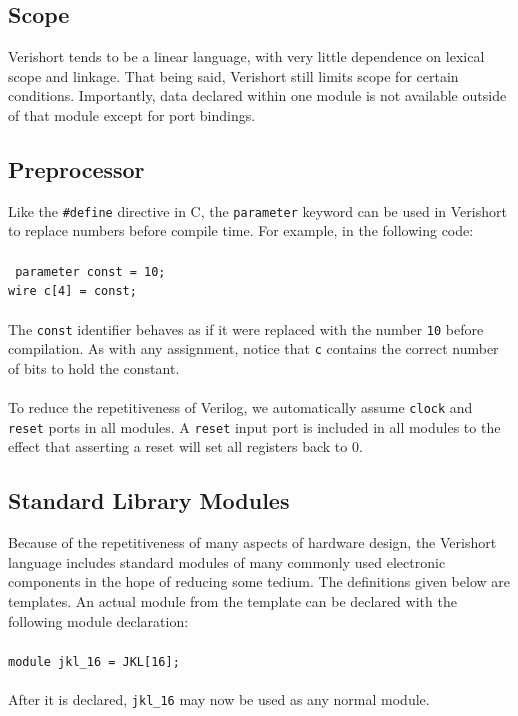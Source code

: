 \documentclass[letterpaper,11pt]{article}
\begin{document}
    \subsection{Scope}
    Verishort tends to be a linear language, with very little dependence on lexical scope and linkage. 
    That being said, Verishort still limits scope for certain conditions.  Importantly, data declared 
    within one module is not available outside of that module except for port bindings.
    
    \subsection{Preprocessor}
    Like the \texttt{\#define} directive in C, the \texttt{parameter} keyword can be used in Verishort to replace 
    numbers before compile time.  For example, in the following code:\\\\
    \texttt{
    parameter const = 10; \\
    wire c[4] = const;}\\\\
    The \texttt{const} identifier behaves as if it were replaced with the number \texttt{10} before compilation.  As with any assignment, 
    notice that \texttt{c} contains the correct number of bits to hold the constant.\\\\
    To reduce the repetitiveness of Verilog, we automatically assume \texttt{clock} and \texttt{reset} ports in all modules.  A \texttt{reset} input port is included in all modules to the effect that asserting a reset will set all registers back to 0.
    
    \subsection{Standard Library Modules}
    Because of the repetitiveness of many aspects of hardware design, the Verishort language includes standard modules 
    of many commonly used electronic components in the hope of reducing some tedium. The definitions given below are templates.
    An actual module from the template can be declared with the following module declaration:\\\\
    \texttt{module jkl\_16 = JKL[16];}\\\\
    After it is declared, \texttt{jkl\_16} may now be used as any normal module.
    
\end{document}
